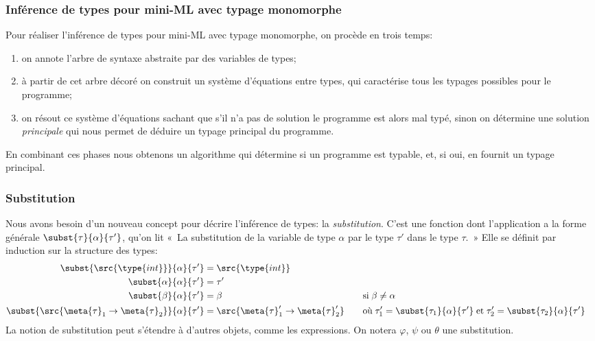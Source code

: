 %
\begin{frame}
\frametitle{Inférence de types pour mini-ML avec typage monomorphe}

Pour réaliser l'inférence de types pour mini-ML avec typage
monomorphe, on procède en trois temps:
\begin{enumerate}

  \item on annote l'arbre de syntaxe abstraite par des variables de
  types;

  \item à partir de cet arbre décoré on construit un système
  d'équations entre types, qui caractérise tous les typages possibles
  pour le programme;

  \item on résout ce système d'équations sachant que s'il n'a pas de
  solution le programme est alors mal typé, sinon on détermine une
  solution \emph{principale} qui nous permet de déduire un typage
  principal du programme.

\end{enumerate}
En combinant ces phases nous obtenons un algorithme qui détermine si
un programme est typable, et, si oui, en fournit un typage principal.

\end{frame}

%
\begin{frame}
\frametitle{Substitution}

Nous avons besoin d'un nouveau concept pour décrire l'inférence de
types: la \emph{substitution}. C'est une fonction dont l'application a
la forme générale $\subst{\tau}{\alpha}{\tau'}$, qu'on lit «~La
substitution de la variable de type $\alpha$ par le type $\tau'$ dans
le type $\tau$.~» Elle se définit par induction sur la structure des
types:
{\small
\begin{alignat*}{2}
\subst{\src{\type{int}}}{\alpha}{\tau'} &= \src{\type{int}}\\
\subst{\alpha}{\alpha}{\tau'} &= \tau'\\
\subst{\beta}{\alpha}{\tau'} &= \beta  && \quad \text{si} \; \beta \neq
  \alpha\\
\subst{\src{\meta{\tau}_1 \rightarrow \meta{\tau}_2}}{\alpha}{\tau'}
&= \src{\meta{\tau}'_1 \rightarrow \meta{\tau}'_2}
&& \quad \text{où} \; \tau'_1 = \subst{\tau_1}{\alpha}{\tau'} \;
\text{et} \; \tau'_2 = \subst{\tau_2}{\alpha}{\tau'}
\end{alignat*}
}
La notion de substitution peut s'étendre à d'autres objets, comme les
expressions. On notera $\varphi$, $\psi$ ou $\theta$ une
substitution.

\end{frame}

